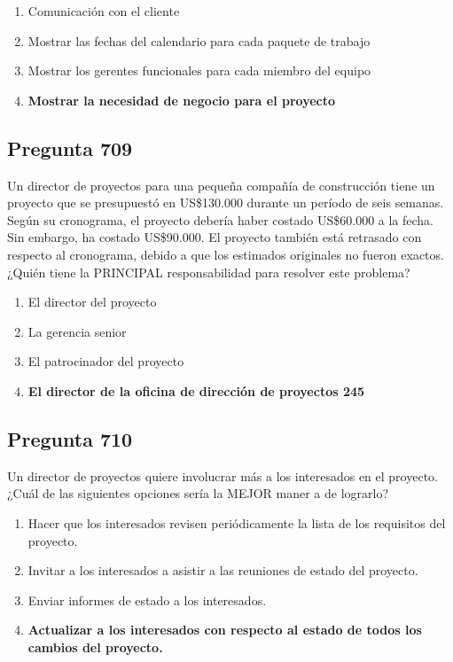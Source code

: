 \documentclass[11pt,a4paper]{article}
\begin{document}
\begin{enumerate}[label=\alph*)]
  \item Comunicación con el cliente
  \item Mostrar las fechas del calendario para cada paquete de trabajo
  \item Mostrar los gerentes funcionales para cada miembro del equipo
  \item \textbf{Mostrar la necesidad de negocio para el proyecto}
\end{enumerate}

\subsection*{Pregunta 709}
Un director de proyectos para una pequeña compañía de construcción tiene un proyecto que se presupuestó en US\$130.000 durante un período de seis semanas. Según su cronograma, el proyecto debería haber costado US\$60.000 a la fecha. Sin embargo, ha costado US\$90.000. El proyecto también está retrasado con respecto al cronograma, debido a que los estimados originales no fueron exactos. ¿Quién tiene la PRINCIPAL responsabilidad para resolver este problema?

\begin{enumerate}[label=\alph*)]
  \item El director del proyecto
  \item La gerencia senior
  \item El patrocinador del proyecto
  \item \textbf{El director de la oficina de dirección de proyectos 245}
\end{enumerate}

\subsection*{Pregunta 710}
Un director de proyectos quiere involucrar más a los interesados en el proyecto. ¿Cuál de las siguientes opciones sería la MEJOR maner a de lograrlo?

\begin{enumerate}[label=\alph*)]
  \item Hacer que los interesados revisen periódicamente la lista de los requisitos del proyecto.
  \item Invitar a los interesados a asistir a las reuniones de estado del proyecto.
  \item Enviar informes de estado a los interesados.
  \item \textbf{Actualizar a los interesados con respecto al estado de todos los cambios del proyecto.}
\end{enumerate}
\end{document}
